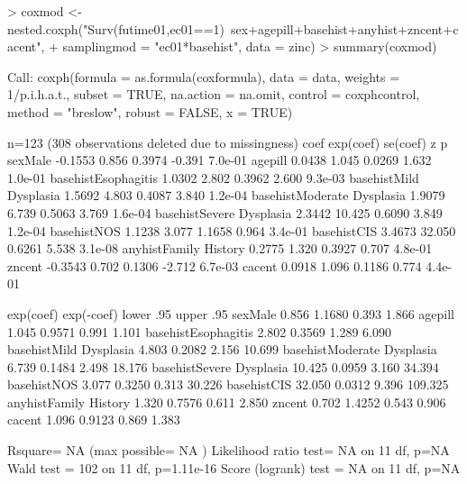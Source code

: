 \documentclass[10pt]{article}
\begin{document}
\begin{Schunk}
\begin{Sinput}
> coxmod <- nested.coxph("Surv(futime01,ec01==1)~sex+agepill+basehist+anyhist+zncent+cacent", 
+     samplingmod = "ec01*basehist", data = zinc)
> summary(coxmod)
\end{Sinput}
\begin{Soutput}
Call:
coxph(formula = as.formula(coxformula), data = data, weights = 1/p.i.h.a.t., 
    subset = TRUE, na.action = na.omit, control = coxphcontrol, 
    method = "breslow", robust = FALSE, x = TRUE)

  n=123 (308 observations deleted due to missingness)
                              coef exp(coef) se(coef)      z       p
sexMale                    -0.1553     0.856   0.3974 -0.391 7.0e-01
agepill                     0.0438     1.045   0.0269  1.632 1.0e-01
basehistEsophagitis         1.0302     2.802   0.3962  2.600 9.3e-03
basehistMild Dysplasia      1.5692     4.803   0.4087  3.840 1.2e-04
basehistModerate Dysplasia  1.9079     6.739   0.5063  3.769 1.6e-04
basehistSevere Dysplasia    2.3442    10.425   0.6090  3.849 1.2e-04
basehistNOS                 1.1238     3.077   1.1658  0.964 3.4e-01
basehistCIS                 3.4673    32.050   0.6261  5.538 3.1e-08
anyhistFamily History       0.2775     1.320   0.3927  0.707 4.8e-01
zncent                     -0.3543     0.702   0.1306 -2.712 6.7e-03
cacent                      0.0918     1.096   0.1186  0.774 4.4e-01

                           exp(coef) exp(-coef) lower .95 upper .95
sexMale                        0.856     1.1680     0.393     1.866
agepill                        1.045     0.9571     0.991     1.101
basehistEsophagitis            2.802     0.3569     1.289     6.090
basehistMild Dysplasia         4.803     0.2082     2.156    10.699
basehistModerate Dysplasia     6.739     0.1484     2.498    18.176
basehistSevere Dysplasia      10.425     0.0959     3.160    34.394
basehistNOS                    3.077     0.3250     0.313    30.226
basehistCIS                   32.050     0.0312     9.396   109.325
anyhistFamily History          1.320     0.7576     0.611     2.850
zncent                         0.702     1.4252     0.543     0.906
cacent                         1.096     0.9123     0.869     1.383

Rsquare= NA   (max possible= NA )
Likelihood ratio test= NA  on 11 df,   p=NA
Wald test            = 102  on 11 df,   p=1.11e-16
Score (logrank) test = NA  on 11 df,   p=NA
\end{Soutput}
\end{Schunk}
\end{document}
